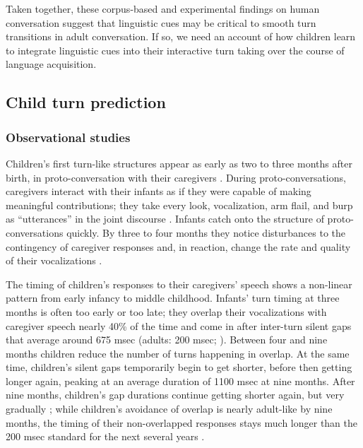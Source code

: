 \documentclass[authoryear, 12pt]{elsarticle}
\begin{document}
Taken together, these corpus-based and experimental findings on human conversation suggest that linguistic cues may be critical to smooth turn transitions in adult conversation. If so, we need an account of how children learn to integrate linguistic cues into their interactive turn taking over the course of language acquisition.

\subsection{Child turn prediction}

\subsubsection{Observational studies}

Children's first turn-like structures appear as early as two to three months after birth, in proto-conversation with their caregivers \citep{bruner1975, bruner1985}. During proto-conversations, caregivers interact with their infants as if they were capable of making meaningful contributions; they take every look, vocalization, arm flail, and burp as ``utterances'' in the joint discourse \citep{bateson1975, jaffe2001, snow1977}. Infants catch onto the structure of proto-conversations quickly. By three to four months they notice disturbances to the contingency of caregiver responses and, in reaction, change the rate and quality of their vocalizations \citep{k-bloom1988, masataka1993}.

The timing of children's responses to their caregivers' speech shows a non-linear pattern from early infancy to middle childhood. Infants' turn timing at three months is often too early or too late; they overlap their vocalizations with caregiver speech nearly 40\% of the time and come in after inter-turn silent gaps that average around 675 msec (adults: 200 msec; \citealp{hilbrinkUR}). Between four and nine months children reduce the number of turns happening in overlap. At the same time, children's silent gaps temporarily begin to get shorter, before then getting longer again, peaking at an average duration of 1100 msec at nine months. After nine months, children's gap durations continue getting shorter again, but very gradually \citep{casillas2015, hilbrinkUR}; while children's avoidance of overlap is nearly adult-like by nine months, the timing of their non-overlapped responses stays much longer than the 200 msec standard for the next several years \citep{garvey1984, ervin-tripp1979}.
\end{document}
